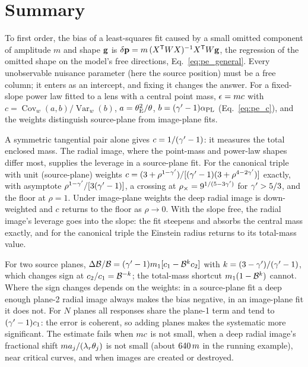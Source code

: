 \section{Summary}
\label{sec:pe_summary}

To first order, the bias of a least-squares fit caused by a small
omitted component of amplitude $m$ and shape $\vb{g}$ is
$\delta\vb{p}=m\,(X^{\mathsf T}WX)^{-1}X^{\mathsf T}W\vb{g}$, the
regression of the omitted shape on the model's free directions,
Eq.~\eqref{eq:pe_general}. Every unobservable nuisance parameter (here
the source position) must be a free column; it enters as an intercept,
and fixing it changes the answer. For a fixed-slope power law fitted to
a lens with a central point mass, $\epsilon=m c$ with
$c=\operatorname{Cov}_w(a,b)/\operatorname{Var}_w(b)$,
$a=\theta_{\mathrm{E}}^2/\theta$, $b=(\gamma'-1)\alpha_{\rm PL}$ (Eq.~\eqref{eq:pe_c}),
and the weights distinguish source-plane from image-plane fits.

A symmetric tangential pair alone gives $c=1/(\gamma'-1)$: it measures the
total enclosed mass. The radial image, where the point-mass and
power-law shapes differ most, supplies the leverage in a source-plane
fit. For the canonical triple with unit (source-plane) weights
$c=(3+\rho^{1-\gamma'})/[(\gamma'-1)(3+\rho^{4-2\gamma'})]$ exactly, with asymptote
$\rho^{1-\gamma'}/[3(\gamma'-1)]$, a crossing at $\rho_\times=9^{1/(5-3\gamma')}$
for $\gamma'>5/3$, and the floor at $\rho=1$. Under image-plane weights the
deep radial image is down-weighted and $c$ returns to the floor as
$\rho\to0$. With the slope free, the radial image's leverage goes into
the slope: the fit steepens and absorbs the central mass exactly, and
for the canonical triple the Einstein radius returns to its total-mass
value.

For two source planes,
$\Delta\mathcal{B}/\mathcal{B}=(\gamma'-1)m_1[c_1-\mathcal{B}^{k}c_2]$ with
$k=(3-\gamma')/(\gamma'-1)$, which changes sign at $c_2/c_1=\mathcal{B}^{-k}$; the
total-mass shortcut $m_1(1-\mathcal{B}^{k})$ cannot. Where the sign changes
depends on the weights: in a source-plane fit a deep enough plane-2
radial image always makes the bias negative, in an image-plane fit it
does not. For $N$ planes all responses share the plane-1 term and tend
to $(\gamma'-1)c_1$: the error is coherent, so adding planes makes the
systematic more significant. The estimate fails when $m c$ is not
small, when a deep radial image's fractional shift
$m a_j/(\lambda_r\theta_j)$ is not small (about $640\,m$ in the
running example), near critical curves, and when images are created or
destroyed.

